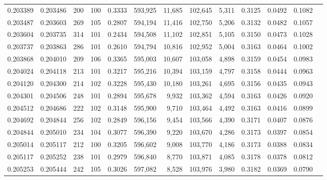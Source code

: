 \begin{tabular}{rrrrrrrrrrrrr}
0.203389 & 0.203486 &   200 & 100 &                                     0.3333 & 593,925 &  11,685 & 102,645 &   5,311 & 0.3125 & 0.0492 & 0.1082 \\
0.203487 & 0.203603 &   269 & 105 &                                     0.2807 & 594,194 &  11,416 & 102,750 &   5,206 & 0.3132 & 0.0482 & 0.1057 \\
0.203604 & 0.203735 &   314 & 101 &                                     0.2434 & 594,508 &  11,102 & 102,851 &   5,105 & 0.3150 & 0.0473 & 0.1028 \\
0.203737 & 0.203863 &   286 & 101 &                                     0.2610 & 594,794 &  10,816 & 102,952 &   5,004 & 0.3163 & 0.0464 & 0.1002 \\
0.203868 & 0.204010 &   209 & 106 &                                     0.3365 & 595,003 &  10,607 & 103,058 &   4,898 & 0.3159 & 0.0454 & 0.0983 \\
0.204024 & 0.204118 &   213 & 101 &                                     0.3217 & 595,216 &  10,394 & 103,159 &   4,797 & 0.3158 & 0.0444 & 0.0963 \\
0.204120 & 0.204300 &   214 & 102 &                                     0.3228 & 595,430 &  10,180 & 103,261 &   4,695 & 0.3156 & 0.0435 & 0.0943 \\
0.204301 & 0.204506 &   248 & 101 &                                     0.2894 & 595,678 &   9,932 & 103,362 &   4,594 & 0.3163 & 0.0426 & 0.0920 \\
0.204512 & 0.204686 &   222 & 102 &                                     0.3148 & 595,900 &   9,710 & 103,464 &   4,492 & 0.3163 & 0.0416 & 0.0899 \\
0.204692 & 0.204844 &   256 & 102 &                                     0.2849 & 596,156 &   9,454 & 103,566 &   4,390 & 0.3171 & 0.0407 & 0.0876 \\
0.204844 & 0.205010 &   234 & 104 &                                     0.3077 & 596,390 &   9,220 & 103,670 &   4,286 & 0.3173 & 0.0397 & 0.0854 \\
0.205014 & 0.205117 &   212 & 100 &                                     0.3205 & 596,602 &   9,008 & 103,770 &   4,186 & 0.3173 & 0.0388 & 0.0834 \\
0.205117 & 0.205252 &   238 & 101 &                                     0.2979 & 596,840 &   8,770 & 103,871 &   4,085 & 0.3178 & 0.0378 & 0.0812 \\
0.205253 & 0.205444 &   242 & 105 &                                     0.3026 & 597,082 &   8,528 & 103,976 &   3,980 & 0.3182 & 0.0369 & 0.0790 \\

\end{tabular}
